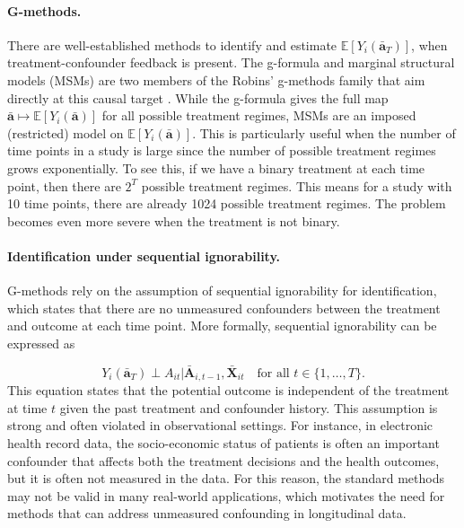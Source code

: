 \paragraph{G-methods.}
There are well-established methods to identify and estimate $\mathbb{E}[Y_i(\bar{\mathbf{a}}_T)]$, 
when treatment-confounder feedback is present. The g-formula and marginal structural models (MSMs) are 
two members of the Robins' g-methods family that aim directly at this causal target 
\cite{robinsMarginalStructuralModels2000, shinozakiUnderstandingMarginalStructural2020, snowdenImplementationGComputationSimulated2011}.
While the g-formula gives the full map $
\bar{\mathbf{a}} \mapsto \mathbb{E}\!\left[Y_i(\bar{\mathbf{a}})\right]$ for all possible treatment regimes, MSMs are 
an imposed (restricted) model on $\mathbb{E}\!\left[Y_i(\bar{\mathbf{a}})\right]$. This is particularly 
useful when the number of time points in a study is large since the number of possible treatment regimes grows 
exponentially. To see this, if we have a binary treatment at each time point, then there are $2^T$ 
possible treatment regimes. This means for a study with 10 time points, there are already 1024 possible 
treatment regimes. The problem becomes even more severe when the treatment is not binary. 

\paragraph{Identification under sequential ignorability.}
G-methods rely on the assumption of sequential ignorability for identification, which 
states that there are no unmeasured confounders between the 
treatment and outcome at each time point.  More formally, 
sequential ignorability can be expressed as 

\begin{equation}
    \label{eq:seq-ignorability}
Y_i(\bar{\mathbf{a}}_T) \perp A_{it} | \bar{\mathbf{A}}_{i,t-1}, \bar{\mathbf{X}}_{it} \quad \text{for all } t \in \{1, \ldots, T\}.
\end{equation}
This equation states that the potential outcome is independent of the treatment at time $t$ given the past treatment and confounder history. 
This assumption is strong and often violated in observational settings. For instance, 
in electronic health record data, the socio-economic status of patients is often 
an important confounder that affects both the treatment decisions and the health 
outcomes, but it is often not measured in the data. For this reason, the 
standard methods may not be valid in many real-world applications,
which motivates the need for methods that can address unmeasured confounding in longitudinal data.

